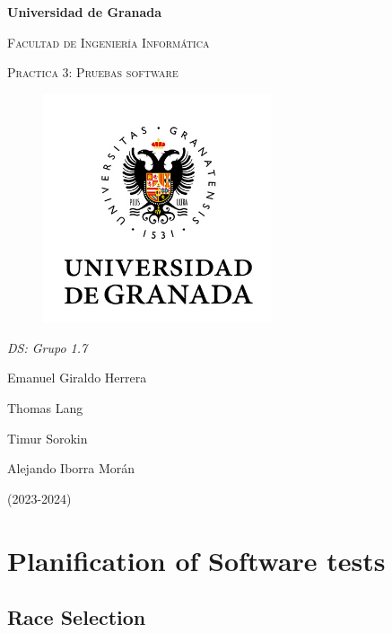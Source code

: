 \documentclass{article}
\begin{document}
    \begin{titlepage}
        \centering
        {\bfseries\LARGE Universidad de Granada\par}
        \vspace{1cm}
        {\scshape\Large Facultad de Ingeniería Informática \par}
        \vspace{2cm}
        {\scshape\Huge Practica 3: Pruebas software \par}
        \begin{figure}[h]
                \centering
                \includegraphics[width=0.6\textwidth]{logo_UGR.jpg}
                \label{fig:portada}
            \end{figure}
        {\itshape\Large DS: Grupo 1.7\par}
        \vfill
            {\Large  Emanuel Giraldo Herrera\par}
            {\Large  Thomas Lang \par}
            {\Large  Timur Sorokin \par}
            {\Large  Alejando Iborra Morán \par}
        \vfill
        {\Large (2023-2024) \par}
    \end{titlepage}

\tableofcontents

\newpage
\section{Planification of Software tests}
\subsection{Race Selection}
\end{document}
